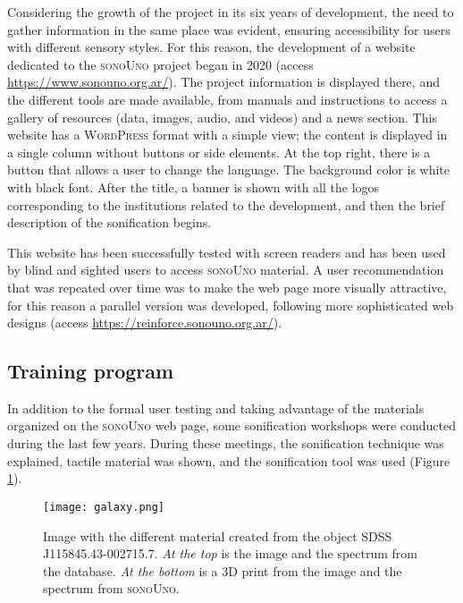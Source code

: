 \documentclass[baaa]{baaa}
\begin{document}
Considering the growth of the project in its six years of development, the need to gather information in the same place was evident, ensuring accessibility for users with different sensory styles. For this reason, the development of a website dedicated to the \textsc{sonoUno} project began in 2020 (access \url{https://www.sonouno.org.ar/}). The project information is displayed there, and the different tools are made available, from manuals and instructions to access a gallery of resources (data, images, audio, and videos) and a news section. This website has a \textsc{WordPress} format with a simple view; the content is displayed in a single column without buttons or side elements. At the top right, there is a button that allows a user to change the language. The background color is white with black font. After the title, a banner is shown with all the logos corresponding to the institutions related to the development, and then the brief description of the sonification begins.

This website has been successfully tested with screen readers and has been used by blind and sighted users to access \textsc{sonoUno} material. A user recommendation that was repeated over time was to make the web page more visually attractive, for this reason a parallel version was developed, following more sophisticated web designs (access \url{https://reinforce.sonouno.org.ar/}).

\subsection{Training program}

In addition to the formal user testing and taking advantage of the materials organized on the \textsc{sonoUno} web page, some sonification workshops were conducted during the last few years. During these meetings, the sonification technique was explained, tactile material was shown, and the sonification tool was used (Figure \ref{fig:galaxy}).

\begin{figure}[!t]
\centering
    \texttt{[image: galaxy.png]}
    \caption{Image with the different material created from the object SDSS J115845.43-002715.7. \emph{At the top} is the image and the spectrum from the database. \emph{At the bottom} is a 3D print from the image and the spectrum from \textsc{sonoUno}.}
    \label{fig:galaxy}
\end{figure}
\end{document}
